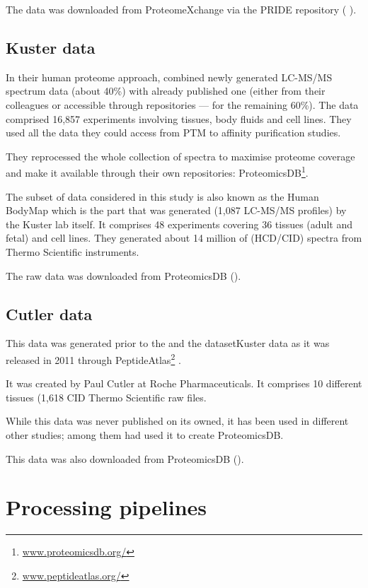 The data was downloaded from ProteomeXchange via the PRIDE repository (%
).

\subsection{Kuster data}

In their human proteome approach,
\cite{KusterData} combined newly generated \gls{LC-MS/MS} spectrum
data (about 40\%) with already published one
(either from their colleagues or accessible through repositories ---
for the remaining 60\%).
The data comprised 16,857 experiments involving tissues, body fluids and cell
lines. They used all the data they could access from \gls{PTM} to affinity
purification studies.

They reprocessed the whole collection of spectra to maximise proteome coverage
and make it available through their own repositories: ProteomicsDB\footnote{%
\href{https://www.proteomicsdb.org/}{www.proteomicsdb.org/}}.

The subset of data considered in this study is also known as the Human BodyMap
which is the part that was generated (1,087 \gls{LC-MS/MS} profiles)
by the Kuster lab itself.
It comprises 48 experiments covering 36 tissues
(adult and fetal) and cell lines.
They generated about 14 million of (\gls{HCD}/\gls{CID}) spectra from Thermo
Scientific instruments.

The raw data was downloaded from ProteomicsDB ().


\subsection{Cutler data}

This data was generated prior to the  and the dataset{Kuster}
data as it was released in 2011 through PeptideAtlas\footnote{%
    \href{http://www.peptideatlas.org/}{www.peptideatlas.org/}}
\citep{PeptideAtlas}.

It was created by Paul Cutler at Roche Pharmaceuticals.
It comprises 10 different tissues (1,618 \gls{CID} Thermo Scientific raw files.

While this data was never published on its owned, it has been used in different
other studies; among them \cite{KusterData} had used it to create ProteomicsDB.

This data was also downloaded from ProteomicsDB ().


\section{Processing pipelines}

